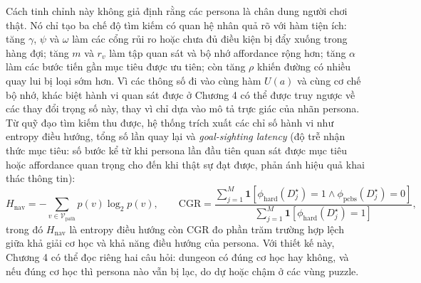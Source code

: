 \documentclass[oneside,a4paper,12pt]{extreport}
\begin{document}
Cách tinh chỉnh này không giả định rằng các persona là chân dung người chơi thật. Nó chỉ tạo ba chế độ tìm kiếm có quan hệ nhân quả rõ với hàm tiện ích: tăng $\gamma$, $\psi$ và $\omega$ làm các cổng rủi ro hoặc chưa đủ điều kiện bị đẩy xuống trong hàng đợi; tăng $m$ và $r_v$ làm tập quan sát và bộ nhớ affordance rộng hơn; tăng $\alpha$ làm các bước tiến gần mục tiêu được ưu tiên; còn tăng $\rho$ khiến đường có nhiều quay lui bị loại sớm hơn. Vì các thông số đi vào cùng hàm $U(a)$ và cùng cơ chế bộ nhớ, khác biệt hành vi quan sát được ở Chương 4 có thể được truy ngược về các thay đổi trọng số này, thay vì chỉ dựa vào mô tả trực giác của nhãn persona. Từ quỹ đạo tìm kiếm thu được, hệ thống trích xuất các chỉ số hành vi như entropy điều hướng, tổng số lần quay lại và \emph{goal-sighting latency} (độ trễ nhận thức mục tiêu: số bước kể từ khi persona lần đầu tiên quan sát được mục tiêu hoặc affordance quan trọng cho đến khi thật sự đạt được, phản ánh hiệu quả khai thác thông tin):
\begin{equation}
H_{\mathrm{nav}}=-\sum_{v\in \mathcal{V}_{\mathrm{path}}} p(v)\log_2 p(v),
\qquad
\mathrm{CGR}=
\frac{\sum_{j=1}^{M}\mathbf{1}\!\left[\phi_{\mathrm{hard}}(D_j^{\star})=1 \land \phi_{\mathrm{pcbs}}(D_j^{\star})=0\right]}
{\sum_{j=1}^{M}\mathbf{1}\!\left[\phi_{\mathrm{hard}}(D_j^{\star})=1\right]},
\end{equation}
trong đó $H_{\mathrm{nav}}$ là entropy điều hướng còn $\mathrm{CGR}$ đo phần trăm trường hợp lệch giữa khả giải cơ học và khả năng điều hướng của persona. Với thiết kế này, Chương 4 có thể đọc riêng hai câu hỏi: dungeon có đúng cơ học hay không, và nếu đúng cơ học thì persona nào vẫn bị lạc, do dự hoặc chậm ở các vùng puzzle.
\end{document}
